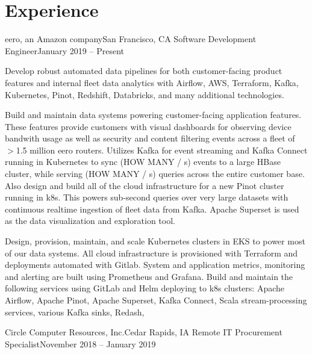 \resumeSubHeadingListEnd

\section{Experience}
\resumeSubHeadingListStart

\resumeSubheading
{eero, an Amazon company}{San Francisco, CA}
{Software Development Engineer}{January 2019 -- Present}

\resumeItemListStart

{Develop robust automated data pipelines for both customer-facing product features and internal fleet data analytics with Airflow, AWS, Terraform, Kafka, Kubernetes, Pinot, Redshift, Databricks, and many additional technologies.}

{Build and maintain data systems powering customer-facing application features. These features provide customers with visual dashboards for observing device bandwith usage as well as security and content filtering events across a fleet of $>$1.5 million eero routers. Utilizes Kafka for event streaming and Kafka Connect running in Kubernetes to sync (HOW MANY / s) events to a large HBase cluster, while serving (HOW MANY / s) queries across the entire customer base. Also design and build all of the cloud infrastructure for a new Pinot cluster running in k8s. This powers sub-second queries over very large datasets with continuous realtime ingestion of fleet data from Kafka. Apache Superset is used as the data visualization and exploration tool.}

{Design, provision, maintain, and scale Kubernetes clusters in EKS to power most of our data systems. All cloud infrastructure is provisioned with Terraform and deployments automated with Gitlab. System and application metrics, monitoring and alerting are built using Prometheus and Grafana. Build and maintain the following services using GitLab and Helm deploying to k8s clusters: Apache Airflow, Apache Pinot, Apache Superset, Kafka Connect, Scala stream-processing services, various Kafka sinks, Redash, }

\resumeItemListEnd

\resumeSubheading
{Circle Computer Resources, Inc.}{Cedar Rapids, IA}
{Remote IT Procurement Specialist}{November 2018 -- January 2019}

\resumeItemListStart

